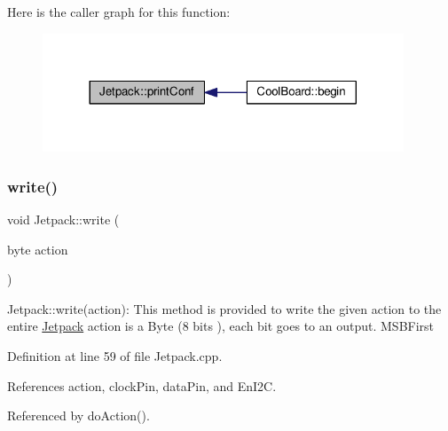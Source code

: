 Here is the caller graph for this function\+:\nopagebreak
\begin{figure}[H]
\begin{center}
\leavevmode
\includegraphics[width=305pt]{classJetpack_ac54a7bb4f9166bee32052253d9b1d306_icgraph}
\end{center}
\end{figure}
\mbox{\label{classJetpack_a338f1af8cbc6504ac69b47c7328569b5}} 
\subsubsection{\texorpdfstring{write()}{write()}}
{\footnotesize\ttfamily void Jetpack\+::write (\begin{DoxyParamCaption}\item[{byte}]{action }\end{DoxyParamCaption})}

Jetpack\+::write(action)\+: This method is provided to write the given action to the entire \hyperlink{classJetpack}{Jetpack} action is a Byte (8 bits ), each bit goes to an output. M\+S\+B\+First 

Definition at line 59 of file Jetpack.\+cpp.



References action, clock\+Pin, data\+Pin, and En\+I2C.



Referenced by do\+Action().


